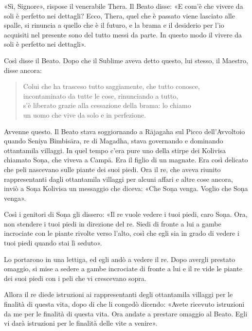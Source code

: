 «Sì, Signore», rispose il venerabile Thera. Il Beato disse: «E com’è che vivere
da soli è perfetto nei dettagli? Ecco, Thera, quel che è passato viene lasciato
alle spalle, si rinuncia a quello che è il futuro, e la brama e il desiderio per
l’io acquisiti nel presente sono del tutto messi da parte. In questo modo il
vivere da soli è perfetto nei dettagli».

Così disse il Beato. Dopo che il Sublime aveva detto questo, lui stesso, il
Maestro, disse ancora:

\begin{quote}
Colui che ha trasceso tutto saggiamente, che tutto conosce, \\
incontaminato da tutte le cose, rinunciando a tutto, \\
s’è liberato grazie alla cessazione della brama: lo chiamo \\
un uomo che vive da solo e in perfezione.
\end{quote}


 Avvenne questo. Il Beato stava soggiornando a Rājagaha sul
Picco dell’Avvoltoio quando Seniya Bimbisāra, re di Magadha, stava governando e
dominando ottantamila villaggi. In quel tempo c’era pure uno della stirpe dei
Kolivisa chiamato Soṇa, che viveva a Campā. Era il figlio di un magnate. Era
così delicato che peli nascevano sulle piante dei suoi piedi. Ora il re, che
aveva riunito rappresentanti dagli ottantamila villaggi per alcuni affari e
altre cose ancora, inviò a Soṇa Kolivisa un messaggio che diceva: «Che Soṇa
venga. Voglio che Soṇa venga».

Così i genitori di Soṇa gli dissero: «Il re vuole vedere i tuoi piedi, caro
Soṇa. Ora, non stendere i tuoi piedi in direzione del re. Siedi di fronte a lui
a gambe incrociate con le piante rivolte verso l’alto, così che egli sia in
grado di vedere i tuoi piedi quando stai lì seduto».

Lo portarono in una lettiga, ed egli andò a vedere il re. Dopo avergli prestato
omaggio, si mise a sedere a gambe incrociate di fronte a lui e il re vide le
piante dei suoi piedi con i peli che vi crescevano sopra.

Allora il re diede istruzioni ai rappresentanti degli ottantamila villaggi per
le finalità di questa vita, dopo di che li congedò dicendo: «Avete ricevuto
istruzioni da me per le finalità di questa vita. Ora andate a prestare omaggio
al Beato. Egli vi darà istruzioni per le finalità delle vite a venire».

